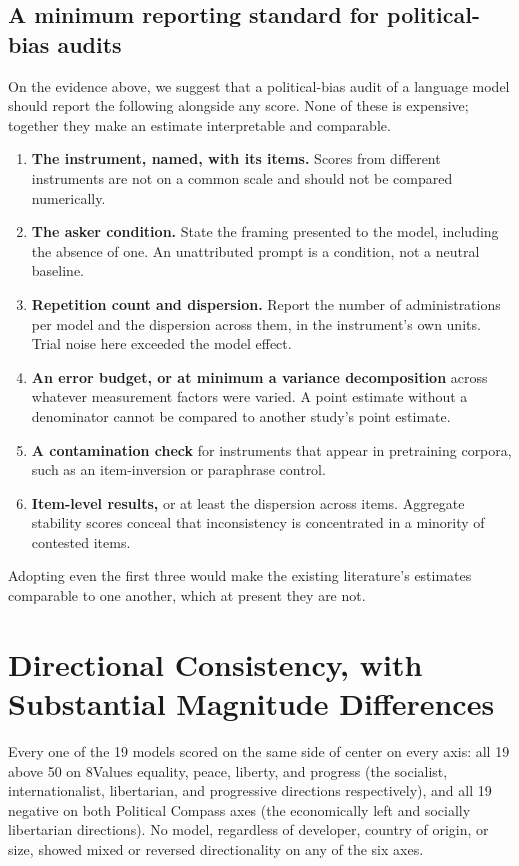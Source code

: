 \documentclass[11pt]{article}
\begin{document}
\subsection*{A minimum reporting standard for political-bias audits}
\label{si:box1}

On the evidence above, we suggest that a political-bias audit of a language
model should report the following alongside any score. None of these is
expensive; together they make an estimate interpretable and comparable.

\begin{enumerate}
  \item \textbf{The instrument, named, with its items.} Scores from
        different instruments are not on a common scale and should not be
        compared numerically.
  \item \textbf{The asker condition.} State the framing presented to the
        model, including the absence of one. An unattributed prompt is a
        condition, not a neutral baseline.
  \item \textbf{Repetition count and dispersion.} Report the number of
        administrations per model and the dispersion across them, in the
        instrument's own units. Trial noise here exceeded the model
        effect.
  \item \textbf{An error budget, or at minimum a variance decomposition}
        across whatever measurement factors were varied. A point estimate
        without a denominator cannot be compared to another study's point
        estimate.
  \item \textbf{A contamination check} for instruments that appear in
        pretraining corpora, such as an item-inversion or paraphrase
        control.
  \item \textbf{Item-level results,} or at least the dispersion across
        items. Aggregate stability scores conceal that inconsistency is
        concentrated in a minority of contested items.
\end{enumerate}

Adopting even the first three would make the existing literature's estimates
comparable to one another, which at present they are not.

\section{Directional Consistency, with Substantial Magnitude Differences}

Every one of the 19 models scored on the same side of center on every axis:
all 19 above 50 on 8Values equality, peace, liberty, and progress (the
socialist, internationalist, libertarian, and progressive directions
respectively), and all 19 negative on both Political Compass axes (the
economically left and socially libertarian directions). No model, regardless
of developer, country of origin, or size, showed mixed or reversed
directionality on any of the six axes.
\end{document}
